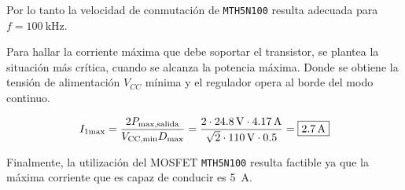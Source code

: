 	Por lo tanto la velocidad de conmutación de \texttt{MTH5N100} resulta adecuada para $f=\SI{100}{\kilo\hertz}$.

	Para hallar la corriente máxima que debe soportar el transistor, se plantea la situación más crítica, cuando se alcanza la potencia máxima. Donde se obtiene la tensión de alimentación $V_{CC}$ mínima y el regulador opera al borde del modo continuo.

\begin{equation}
	\centering
	I_{\textrm{1max}} = \frac{2 P_{\textrm{max,salida}}}{V_{\textrm{CC,min}} D_{\textrm{max}}} = \frac{ 2 \cdot \SI{24.8}{\volt} \cdot \SI{4.17}{\ampere} }{ \sqrt{2} \cdot \SI{110}{\volt} \cdot \num{0,5}  } = \boxed{\SI{2.7}{\ampere}}
\end{equation}

	Finalmente, la utilización del MOSFET \texttt{MTH5N100} resulta factible ya que la máxima corriente que es capaz de conducir es \SI{5}{\ampere}.	
	
	

